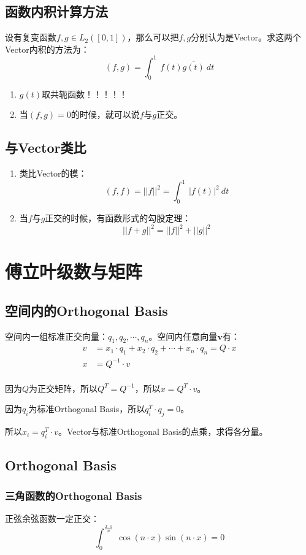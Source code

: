 \subsection{函数内积计算方法}
设有复变函数$f,g\in L_2([0,1])$，那么可以把$f,g$分别认为是Vector。求这两个Vector内积的方法为：
\begin{equation}
	(f,g)=\int_0^1\ f(t)\overline{g(t)}\ dt
\end{equation}
\begin{enumerate}
	\item $g(t)​$取共轭函数！！！！！
	\item 当$(f,g)=0$的时候，就可以说$f$与$g​$正交。
\end{enumerate}
\subsection{与Vector类比}
\begin{enumerate}
	\item 类比Vector的模：
	      $$
		      (f,f)=||f||^2=\int_0^1\ |f(t)|^2 \ dt
	      $$
	\item 当$f$与$g​$正交的时候，有函数形式的勾股定理：
	      $$
		      ||f+g||^2=||f||^2+||g||^2
	      $$
\end{enumerate}
\section{傅立叶级数与矩阵}
\subsection{空间内的Orthogonal Basis}
空间内一组标准正交向量：$q_1,q_2,\cdots ,q_n$。空间内任意向量$\mathbf{v}$有：
\begin{align*}
	v & =x_1\cdot q_1+x_2\cdot q_2+\cdots+x_n\cdot q_n=Q\cdot x \\
	x & =Q^{-1}\cdot v                                          \\
\end{align*}

因为$Q$为正交矩阵，所以$Q^T=Q^{-1}$，所以$x=Q^T\cdot v$。

因为$q_i$为标准Orthogonal Basis，所以$q_i^T\cdot q_j=0$。

所以$x_i=q_i^T\cdot v$。Vector与标准Orthogonal Basis的点乘，求得各分量。
\subsection{Orthogonal Basis}
\subsubsection{三角函数的Orthogonal Basis}
正弦余弦函数一定正交：
$$
	\int_0^{\frac{2\cdot \pi}{n}}\ \cos(n\cdot x)\sin(n\cdot x)=0
$$

